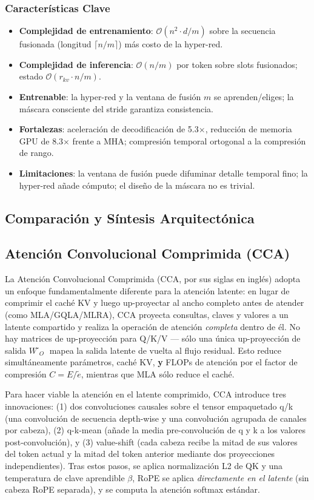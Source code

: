 \subsubsection{Características Clave}
\begin{itemize}[leftmargin=*]
    \item \textbf{Complejidad de entrenamiento}: $\mathcal{O}(n^2 \cdot d / m)$ sobre la secuencia fusionada (longitud $\lceil n/m \rceil$) más costo de la hyper-red.
    \item \textbf{Complejidad de inferencia}: $\mathcal{O}(n/m)$ por token sobre slots fusionados; estado $\mathcal{O}(r_{kv} \cdot n / m)$.
    \item \textbf{Entrenable}: la hyper-red y la ventana de fusión $m$ se aprenden/eliges; la máscara consciente del stride garantiza consistencia.
    \item \textbf{Fortalezas}: aceleración de decodificación de 5.3$\times$, reducción de memoria GPU de 8.3$\times$ frente a MHA; compresión temporal ortogonal a la compresión de rango.
    \item \textbf{Limitaciones}: la ventana de fusión puede difuminar detalle temporal fino; la hyper-red añade cómputo; el diseño de la máscara no es trivial.
\end{itemize}

\subsection{Comparación y Síntesis Arquitectónica}

\subsection{Atención Convolucional Comprimida (CCA)}
La Atención Convolucional Comprimida (CCA, por sus siglas en inglés) \citep{figliola_cca_2025} adopta un enfoque fundamentalmente diferente para la atención latente: en lugar de comprimir el caché KV y luego up-proyectar al ancho completo antes de atender (como MLA/GQLA/MLRA), CCA proyecta consultas, claves y valores a un latente compartido y realiza la operación de atención \emph{completa} dentro de él. No hay matrices de up-proyección para Q/K/V --- sólo una única up-proyección de salida $W̃_O$ mapea la salida latente de vuelta al flujo residual. Esto reduce simultáneamente parámetros, caché KV, \textbf{y} FLOPs de atención por el factor de compresión $C = E/\tilde{e}$, mientras que MLA sólo reduce el caché.

Para hacer viable la atención en el latente comprimido, CCA introduce tres innovaciones: (1) dos convoluciones causales sobre el tensor empaquetado q/k (una convolución de secuencia depth-wise y una convolución agrupada de canales por cabeza), (2) q-k-mean (añade la media pre-convolución de q y k a los valores post-convolución), y (3) value-shift (cada cabeza recibe la mitad de sus valores del token actual y la mitad del token anterior mediante dos proyecciones independientes). Tras estos pasos, se aplica normalización L2 de QK y una temperatura de clave aprendible $\beta$, RoPE se aplica \emph{directamente en el latente} (sin cabeza RoPE separada), y se computa la atención softmax estándar.

